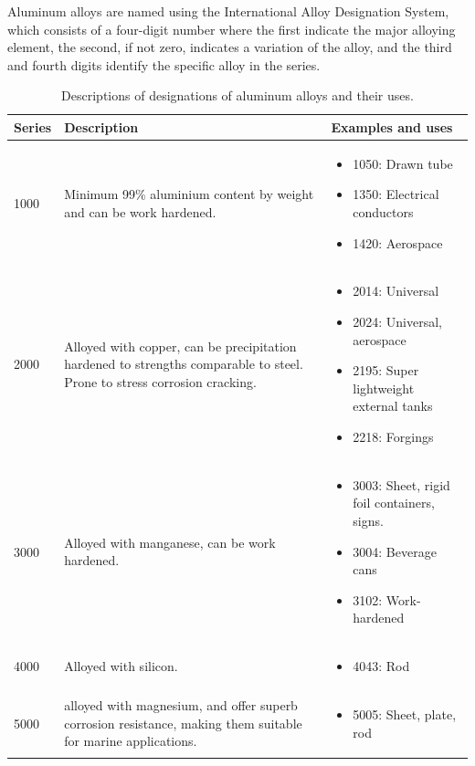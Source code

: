 \documentclass[
10pt,
a4paper,
openany,
svgnames,
]{book}
\begin{document}
Aluminum alloys are named using the International Alloy Designation System, which consists of a four-digit number where the first indicate the major alloying element, the second, if not zero, indicates a variation of the alloy, and the third and fourth digits identify the specific alloy in the series.

\begin{table}[H]
  \caption{Descriptions of designations of aluminum alloys and their uses.}
  \centering
  \begin{tabular}{lp{6cm}p{6cm}}
    \toprule
    Series & Description & Examples and uses \\
    \midrule
    1000 & Minimum 99\% aluminium content by weight and can be work hardened. & \begin{itemize}
    \item 1050: Drawn tube
    \item 1350: Electrical conductors
    \item 1420: Aerospace
    \end{itemize} \\
    2000 & Alloyed with copper, can be precipitation hardened to strengths comparable to steel. Prone to stress corrosion cracking. & \begin{itemize}
    \item 2014: Universal
    \item 2024: Universal, aerospace
    \item 2195: Super lightweight external tanks
    \item 2218: Forgings 
    \end{itemize} \\
    3000 & Alloyed with manganese, can be work hardened. & \begin{itemize}
    \item 3003: Sheet, rigid foil containers, signs.
    \item 3004: Beverage cans
    \item 3102: Work-hardened
    \end{itemize} \\
    4000 & Alloyed with silicon. & \begin{itemize}
    \item 4043: Rod
    \end{itemize} \\
    5000 & alloyed with magnesium, and offer superb corrosion resistance, making them suitable for marine applications. & \begin{itemize}
    \item 5005: Sheet, plate, rod

\end{itemize}
\end{tabular}
\end{table}
\end{document}
